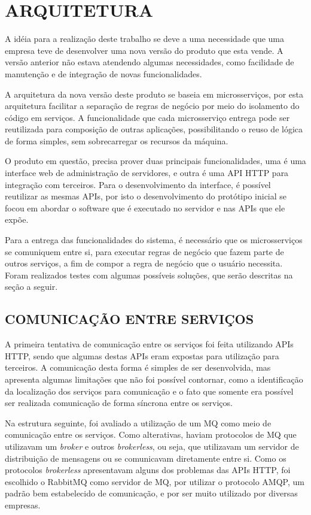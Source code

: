 \chapter{ARQUITETURA}
\label{chp:arquitetura}

A idéia para a realização deste trabalho se deve a uma necessidade que uma
empresa teve de desenvolver uma nova versão do produto que esta vende. A
versão anterior não estava atendendo algumas necessidades, como facilidade
de manutenção e de integração de novas funcionalidades.

A arquitetura da nova versão deste produto se baseia em microsserviços,
por esta arquitetura facilitar a separação de regras de negócio por meio do
isolamento do código em serviços. A funcionalidade que cada microsserviço
entrega pode ser reutilizada para composição de outras aplicações,
possibilitando o reuso de lógica de forma simples, sem sobrecarregar
os recursos da máquina.

O produto em questão, precisa prover duas principais funcionalidades, uma
é uma interface web de administração de servidores, e outra é uma
\ac{API} \ac{HTTP} para integração com terceiros. Para o desenvolvimento da
interface, é possível reutilizar as mesmas \acp{API}, por isto o desenvolvimento
do protótipo inicial se focou em abordar o software que é executado no servidor
e nas \acp{API} que ele expõe.

Para a entrega das funcionalidades do sistema, é necessário que os microsserviços
se comuniquem entre si, para executar regras de negócio que fazem parte de outros
serviços, a fim de compor a regra de negócio que o usuário necessita. Foram
realizados testes com algumas possíveis soluções, que serão descritas na seção
a seguir.

\section{COMUNICAÇÃO ENTRE SERVIÇOS}

A primeira tentativa de comunicação entre os serviços foi feita utilizando
\acp{API} \ac{HTTP}, sendo que algumas destas \acp{API} eram expostas para
utilização para terceiros. A comunicação desta forma é simples de ser desenvolvida,
mas apresenta algumas limitações que não foi possível contornar, como a identificação
da localização dos serviços para comunicação e o fato que somente era possível
ser realizada comunicação de forma síncrona entre os serviços.

Na estrutura seguinte, foi avaliado a utilização de um \ac{MQ} como meio de
comunicação entre os serviços. Como alterativas, haviam protocolos de \ac{MQ}
que utilizavam um \emph{broker} e outros \emph{brokerless}, ou seja, que
utilizavam um servidor de distribuição de mensagens ou se comunicavam diretamente
entre si. Como os protocolos \emph{brokerless} apresentavam alguns dos problemas
das \acp{API} \ac{HTTP}, foi escolhido o RabbitMQ como servidor de \ac{MQ},
por utilizar o protocolo \ac{AMQP}, um padrão bem estabelecido de comunicação,
e por ser muito utilizado por diversas empresas.


